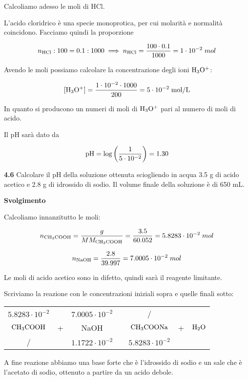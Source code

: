 Calcoliamo adesso le moli di HCl.

L'acido cloridrico è una specie monoprotica, per cui molarità e normalità coincidono. Facciamo quindi la proporzione

$$n_{\rm HCl}:100=0.1:1000
\implies
n_{\rm HCl}=\frac{100 \cdot 0.1}{1000}=1 \cdot 10^{-2}\;mol$$

Avendo le moli possiamo calcolare la concentrazione degli ioni $\rm H_3O^+$:

$$[\rm H_3O^+]=\frac{1 \cdot 10^{-2} \cdot 1000}{200}=5 \cdot 10^{-2}\;mol/L$$

In quanto si producono un numeri di moli di $\rm H_3O^+$ pari al numero di moli di acido.

Il pH sarà dato da

$$\rm pH=\log\left(\frac{1}{5 \cdot 10^{-2}}\right)=1.30$$

\vspace{0.2cm}\textbf{4.6} Calcolare il pH della soluzione ottenuta sciogliendo in acqua 3.5 g di acido acetico e 2.8 g di idrossido di sodio. Il volume finale della soluzione è di 650 mL.

\vspace{0.2cm}\large\textbf{Svolgimento}\normalsize

\vspace{0.2cm}Calcoliamo innanzitutto le moli:

$$n_{\rm CH_3COOH}=\frac{g}{MM_{\rm CH_3COOH}}=\frac{3.5}{60.052}=5.8283 \cdot 10^{-2}\;mol$$

$$n_{\rm NaOH}=\frac{2.8}{39.997}=7.0005 \cdot 10^{-2}\;mol$$

Le moli di acido acetico sono in difetto, quindi sarà il reagente limitante.

Scriviamo la reazione con le concentrazioni iniziali sopra e quelle finali sotto:

\begin{center}
    \begin{tabular}{ccccccc}
        $5.8283 \cdot 10^{-2}$ &  & $7.0005 \cdot 10^{-2}$ & & / &&\\
        $\rm CH_3COOH$ & + & NaOH & \ce{->} & $\rm CH_3COONa$ & + & $\rm H_2O$\\
        / & & $1.1722 \cdot 10^{-2}$ & & $5.8283 \cdot 10^{-2}$&&\\
    \end{tabular}
\end{center}

A fine reazione abbiamo una base forte che è l'idrossido di sodio e un sale che è l'acetato di sodio, ottenuto a partire da un acido debole.

